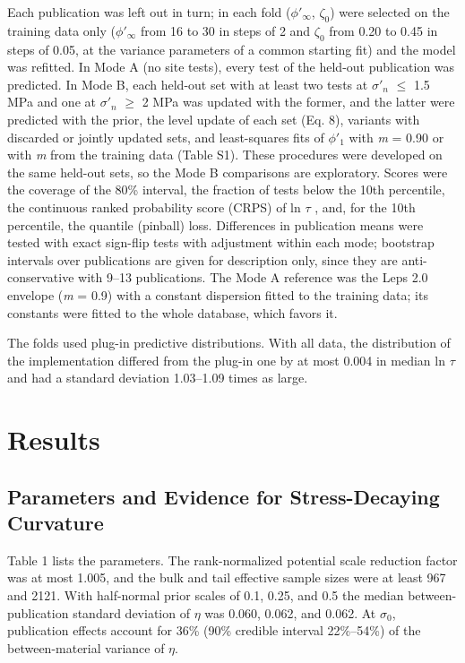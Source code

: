 \documentclass[Journal,letterpaper]{ascelike-new}
\begin{document}
Each publication was left out in turn; in each fold ($\phi'_\infty$, $\zeta_0$) were selected on the training data only ($\phi'_\infty$ from 16\textdegree{} to 30\textdegree{} in steps of 2\textdegree{} and $\zeta_0$ from 0.20 to 0.45 in steps of 0.05, at the variance parameters of a common starting fit) and the model was refitted. In Mode A (no site tests), every test of the held-out publication was predicted. In Mode B, each held-out set with at least two tests at $\sigma'_n$ $\le$ 1.5 MPa and one at $\sigma'_n$ $\ge$ 2 MPa was updated with the former, and the latter were predicted with the prior, the level update of each set (Eq. 8), variants with discarded or jointly updated sets, and least-squares fits of $\phi'_1$ with \textit{m} = 0.90 or with \textit{m} from the training data (Table S1). These procedures were developed on the same held-out sets, so the Mode B comparisons are exploratory. Scores were the coverage of the 80\% interval, the fraction of tests below the 10th percentile, the continuous ranked probability score (CRPS) of ln $\tau$ \cite{gneiting2007}, and, for the 10th percentile, the quantile (pinball) loss. Differences in publication means were tested with exact sign-flip tests with  adjustment within each mode; bootstrap intervals over publications are given for description only, since they are anti-conservative with 9--13 publications. The Mode A reference was the Leps 2.0 envelope (\textit{m} = 0.9) with a constant dispersion fitted to the training data; its constants were fitted to the whole database, which favors it.

The folds used plug-in predictive distributions. With all data, the distribution of the implementation differed from the plug-in one by at most 0.004 in median ln $\tau$ and had a standard deviation 1.03--1.09 times as large.

\section{Results}
\subsection{Parameters and Evidence for Stress-Decaying Curvature}
Table 1 lists the parameters. The rank-normalized potential scale reduction factor was at most 1.005, and the bulk and tail effective sample sizes were at least 967 and 2121. With half-normal prior scales of 0.1, 0.25, and 0.5 the median between-publication standard deviation of $\eta$ was 0.060, 0.062, and 0.062. At $\sigma_0$, publication effects account for 36\% (90\% credible interval 22\%--54\%) of the between-material variance of $\eta$.
\end{document}

